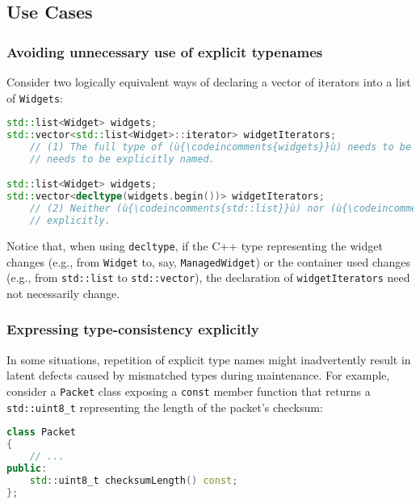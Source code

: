 \subsection[Use Cases]{Use Cases}\label{use-cases-decltype}

\subsubsection[Avoiding unnecessary use of explicit typenames]{Avoiding unnecessary use of explicit typenames}\label{avoiding-unnecessary-use-of-explicit-typenames}

Consider two logically equivalent ways of declaring a vector of
iterators into a list of \lstinline!Widgets!:

\begin{lstlisting}[language=C++]
std::list<Widget> widgets;
std::vector<std::list<Widget>::iterator> widgetIterators;
    // (1) The full type of (ù{\codeincomments{widgets}}ù) needs to be restated, and (ù{\codeincomments{iterator}}ù)
    // needs to be explicitly named.

std::list<Widget> widgets;
std::vector<decltype(widgets.begin())> widgetIterators;
    // (2) Neither (ù{\codeincomments{std::list}}ù) nor (ù{\codeincomments{Widget}}ù) nor (ù{\codeincomments{iterator}}ù) need be named
    // explicitly.
\end{lstlisting}

\noindent Notice that, when using \lstinline!decltype!, if the C++ type representing
the widget changes (e.g., from \lstinline!Widget! to, say,
\lstinline!ManagedWidget!) or the container used changes (e.g., from
\lstinline!std::list! to \lstinline!std::vector!), the declaration of
\lstinline!widgetIterators! need not necessarily change.

\subsubsection[Expressing type-consistency explicitly]{Expressing type-consistency explicitly}\label{expressing-type-consistency-explicitly}

In some situations, repetition of explicit type names might
inadvertently result in latent defects caused by mismatched types during
maintenance. For example, consider a \lstinline!Packet! class exposing a
\lstinline!const! member function that returns a \lstinline!std::uint8_t!
representing the length of the packet's checksum:

\begin{lstlisting}[language=C++]
class Packet
{
    // ...
public:
    std::uint8_t checksumLength() const;
};
\end{lstlisting}

